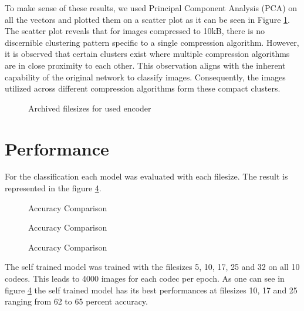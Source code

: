 To make sense of these results, we used Principal Component Analysis (PCA) on all the vectors and plotted them on a scatter plot as it can be seen in Figure \ref{fig: no_transfer}. The scatter plot reveals that for images compressed to 10kB, there is no discernible clustering pattern specific to a single compression algorithm. However, it is observed that certain clusters exist where multiple compression algorithms are in close proximity to each other. This observation aligns with the inherent capability of the original network to classify images. Consequently, the images utilized across different compression algorithms form these compact clusters.

\begin{figure}[h!]
	\centering
	\resizebox{\textwidth}{!}{}
    \caption{Archived filesizes for used encoder}
	\label{fig: no_transfer}
\end{figure}

\section{Performance}
For the classification each model was evaluated with each filesize. The result is represented in the figure \ref{fig: acc_comparison}.

\begin{figure}[h!]
	\centering
	\resizebox{\textwidth}{!}{}
	\caption{Accuracy Comparison}
	\label{fig: acc_comparison}
\end{figure}

\begin{figure}[h!]
	\centering
	\resizebox{\textwidth}{!}{}
	\caption{Accuracy Comparison}
	\label{fig: acc_comparison}
\end{figure}

\begin{figure}[h!]
	\centering
	\resizebox{\textwidth}{!}{}
	\caption{Accuracy Comparison}
	\label{fig: acc_comparison}
\end{figure}

\noindent
The self trained model was trained with the filesizes 5, 10, 17, 25 and 32 on all 10 codecs. This leads to 4000 images for each codec per epoch. As one can see in figure \ref{fig: acc_comparison} the self trained model has its best performances at filesizes 10, 17 and 25 ranging from 62 to 65 percent accuracy.

